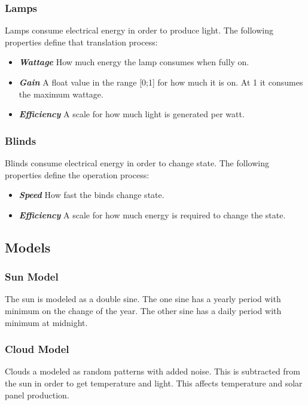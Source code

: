 \documentclass[10pt]{article}
\newcommand{\textdesc}[1]{\textit{\textbf{#1}}} %
\newcommand{\descitem}[1]{\item \textdesc{#1}}
\begin{document}
\subsubsection{Lamps}

Lamps consume electrical energy in order to produce light. The following properties define that translation process:
\begin{itemize}
\descitem{Wattage} How much energy the lamp consumes when fully on.
\descitem{Gain} A float value in the range [0;1] for how much it is on. At 1 it consumes the maximum wattage.
\descitem{Efficiency} A scale for how much light is generated per watt.
\end{itemize}

\subsubsection{Blinds}

Blinds consume electrical energy in order to change state. The following properties define the operation process:
\begin{itemize}
\descitem{Speed} How fast the binds change state.
\descitem{Efficiency} A scale for how much energy is required to change the state.
\end{itemize}

\subsection{Models}

\subsubsection{Sun Model}
\label{sec:internals:models:sun}

The sun is modeled as a double sine. The one sine has a yearly period with minimum on the change of the year. The other sine has a daily period with minimum at midnight.

\subsubsection{Cloud Model}
\label{sec:internals:models:cloud}

Clouds a modeled as random patterns with added noise. This is subtracted from the sun in order to get temperature and light. This affects temperature and solar panel production.
\end{document}
